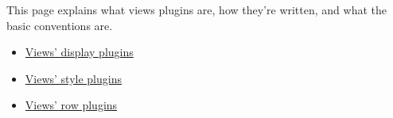 This page explains what views plugins are, how they're written, and what the basic conventions are.

\begin{itemize}
\item \hyperlink{group__views__display__plugins}{Views' display plugins}\item \hyperlink{group__views__style__plugins}{Views' style plugins}\item \hyperlink{group__views__row__plugins}{Views' row plugins} \end{itemize}
